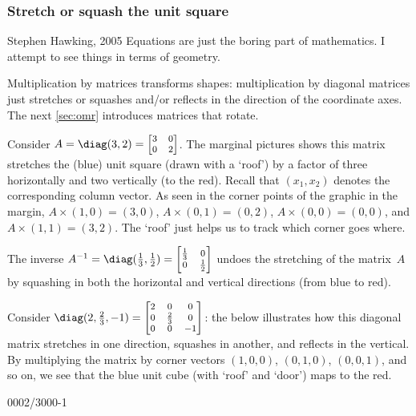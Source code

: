 \subsubsection{Stretch or squash the unit square}

\begin{quoted}{Stephen Hawking, 2005}
Equations are just the boring part of mathematics.  
I attempt to see things in terms of geometry.
\end{quoted}


Multiplication by matrices transforms shapes:
multiplication by diagonal matrices just stretches or squashes and/or reflects in the direction of the coordinate axes.
The next \autoref{sec:omr} introduces matrices that rotate.




\begin{example} \label{eg:}
Consider \(A=\diag(3,2)=\footnotesize\begin{bmatrix} 3&0\\0&2 \end{bmatrix}\). 
%
The marginal pictures shows this matrix stretches the (blue) unit square (drawn with a `roof') by a factor of three horizontally and two vertically (to the red). 
Recall that \((x_1,x_2)\) denotes the corresponding column vector.  
As seen in the corner points of the graphic in the margin,  \(A\times(1,0)=(3,0)\), \(A\times(0,1)=(0,2)\), \(A\times(0,0)=(0,0)\),  and \(A\times(1,1)=(3,2)\).   
The `roof' just helps us to track which corner goes where.

%
The inverse \(A^{-1}=\diag(\frac13,\frac12)=\footnotesize\begin{bmatrix} \frac13&0\\0&\frac12 \end{bmatrix}\) undoes the stretching of the matrix~\(A\) by squashing in both the horizontal and vertical directions (from blue to red).  
\end{example}




\begin{example} \label{eg:}
Consider \(\diag(2,\frac23,-1)=\footnotesize\begin{bmatrix} 2&0&0\\0&\frac23&0\\0&0&-1 \end{bmatrix}\): 
the  below illustrates how this diagonal matrix stretches in one direction, squashes in another, and reflects in the vertical.  
By multiplying the matrix by corner vectors \((1,0,0)\), \((0,1,0)\), \((0,0,1)\), and so on, we see that the blue unit cube (with `roof' and `door') maps to the red.
\begin{center}
\def\unithousesize{small}
000{2/3}000{-1}
\end{center}
\end{example}

